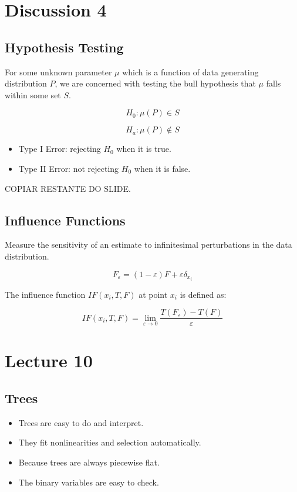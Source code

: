 \documentclass{article}
\begin{document}
\section*{Discussion 4}
\subsection{Hypothesis Testing}

For some unknown parameter $\mu$ which is a function of data generating distribution $P$, we are concerned with testing the bull hypothesis that $\mu$ falls within some set $S$.

$$
H_0: \mu(P) \in S
$$

$$
H_a: \mu(P) \notin S
$$

\begin{itemize}
    \item Type I Error: rejecting $H_0$ when it is true.
    \item Type II Error: not rejecting $H_0$ when it is false.
\end{itemize}

COPIAR RESTANTE DO SLIDE.

\subsection*{Influence Functions}

Measure the sensitivity of an estimate to infinitesimal perturbations in the data distribution.

$$
F_{\varepsilon} = (1 - \varepsilon) F + \varepsilon \delta_{x_i}
$$

The influence function $IF(x_i, T, F)$ at point $x_i$ is defined as:

$$
IF(x_i, T, F) = \lim_{\varepsilon \to 0} \frac{T(F_\varepsilon) - T(F)}{\varepsilon}
$$

\section{Lecture 10}

\subsection{Trees}

\begin{itemize}
    \item Trees are easy to do and interpret.
    \item They fit nonlinearities and selection automatically.
    \item Because trees are always piecewise flat.
    \item The binary variables are easy to check.
\end{itemize}
\end{document}
